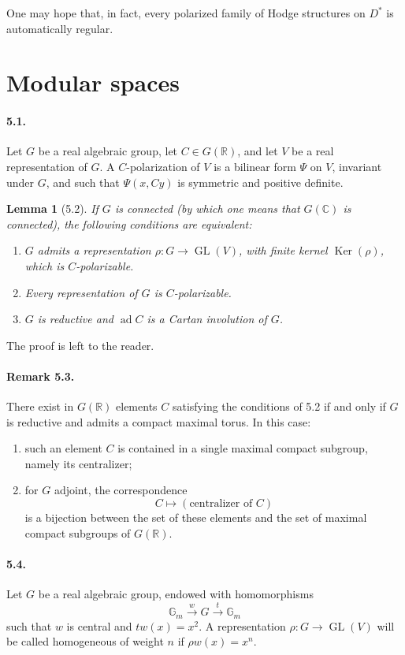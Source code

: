 \documentclass[10pt]{article}
\newcommand{\C}{\mathbb C}
\newcommand{\R}{\mathbb R}
\newcommand{\Ker}{\operatorname{Ker}}
\theoremstyle{deligne}
\newtheorem*{lemma}{Lemma}
\newcommand{\ad}{\operatorname{ad}}
\newcommand{\GL}{\operatorname{GL}}
\begin{document}
One may hope that, in fact, every polarized family of Hodge structures on $D^*$ is automatically regular.

\section{Modular spaces}

\paragraph{5.1.}
Let $G$ be a real algebraic group, let $C\in G(\R)$, and let $V$ be a real representation of $G$. A $C$-polarization of $V$ is a bilinear form $\Psi$ on $V$, invariant under $G$, and such that $\Psi(x,Cy)$ is symmetric and positive definite.

\begin{lemma}[5.2]
If $G$ is connected (by which one means that $G(\C)$ is connected), the following conditions are equivalent:
\begin{enumerate}[label=(\roman*)]
\item $G$ admits a representation $\rho:G\to \GL(V)$, with finite kernel $\Ker(\rho)$, which is $C$-polarizable.
\item Every representation of $G$ is $C$-polarizable.
\item $G$ is reductive and $\ad C$ is a Cartan involution of $G$.
\end{enumerate}
\end{lemma}

The proof is left to the reader.

\paragraph{Remark 5.3.}
There exist in $G(\R)$ elements $C$ satisfying the conditions of 5.2 if and only if $G$ is reductive and admits a compact maximal torus. In this case:
\begin{enumerate}[label=\alph*)]
\item such an element $C$ is contained in a single maximal compact subgroup, namely its centralizer;
\item for $G$ adjoint, the correspondence
\[
  C\longmapsto (\text{centralizer of }C)
\]
is a bijection between the set of these elements and the set of maximal compact subgroups of $G(\R)$.
\end{enumerate}

\paragraph{5.4.}
Let $G$ be a real algebraic group, endowed with homomorphisms
\[
\tag{5.4.1}
 \mathbb G_m \xrightarrow{w} G \xrightarrow{t} \mathbb G_m
\]
such that $w$ is central and $tw(x)=x^2$. A representation $\rho:G\to\GL(V)$ will be called homogeneous of weight $n$ if $\rho w(x)=x^n$.
\end{document}
